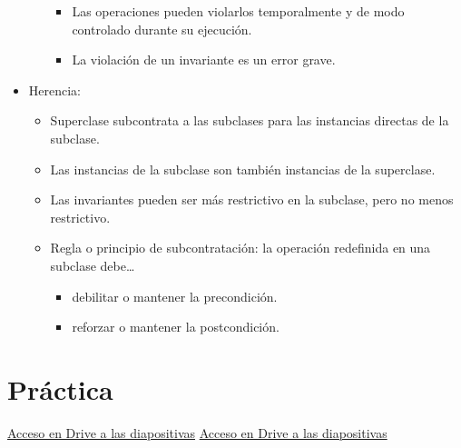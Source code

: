\documentclass[12pt, twoside, openright]{report} %
\begin{document}
\begin{itemize}
\begin{itemize}
		            \begin{itemize}
			            \item Las operaciones pueden violarlos temporalmente y de modo
			                  controlado durante su ejecución.
			            \item La violación de un invariante es un error grave.
		            \end{itemize}
	      \end{itemize}
	\item Herencia:

	      \begin{itemize}
		      \item Superclase subcontrata a las subclases para las instancias
		            directas de la subclase.
		      \item Las instancias de la subclase son también instancias de la
		            superclase.
		      \item Las invariantes pueden ser más restrictivo en la subclase, pero
		            no menos restrictivo.
		      \item Regla o principio de subcontratación: la operación redefinida en
		            una subclase debe\ldots{}

		            \begin{itemize}
			            \item debilitar o mantener la precondición.
			            \item reforzar o mantener la postcondición.
		            \end{itemize}

	      \end{itemize}
\end{itemize}

\chapter{Práctica}
\href{https://drive.google.com/file/d/1IhzCxpn9bw1jV66XE93b-A02epnFmA8a}{Acceso en Drive a las diapositivas}
\href{https://drive.google.com/file/d/1HdEk5KGfG1DJno3Ffo59KatrJkHLz81p}{Acceso en Drive a las diapositivas}
\end{document}
